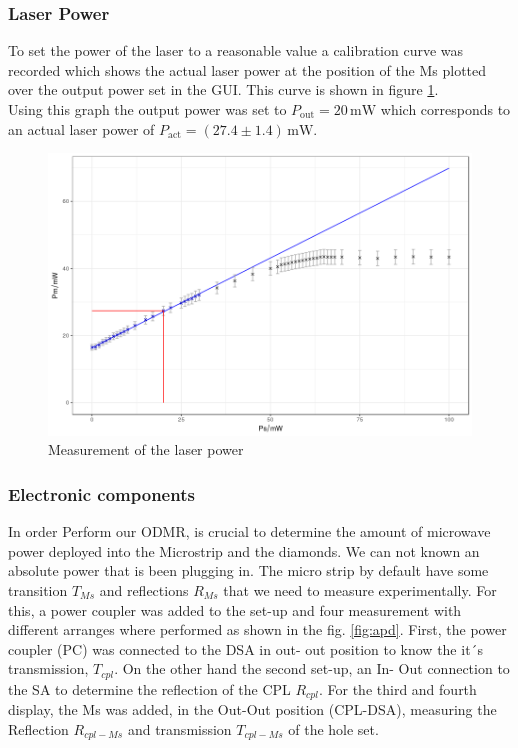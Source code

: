 \subsubsection{Laser Power}
To set the power of the laser to a reasonable value a calibration curve was recorded which shows the actual laser power at the position of the Ms plotted over the output power set in the GUI. This curve is shown in figure \ref{fig:power}.\\

Using this graph the output power was set to $P_\text{out}=20\,\mathrm{mW}$ which corresponds to an actual laser power of $P_\text{act}=(27.4\pm1.4)\,\mathrm{mW}$.
\begin{figure}[hb]
	\centering
	\includegraphics[width=\textwidth]{../figures/powercal.png}
	\caption{Measurement of the laser power}
	\label{fig:power}
\end{figure}


\subsubsection{Electronic components}

In order Perform our ODMR, is crucial to determine the amount of microwave power deployed into the Microstrip and the diamonds. We can not known an absolute power that is been plugging in. The micro strip by default have some transition $T_{Ms}$ and reflections $R_{Ms}$ that we need to measure experimentally.
For this, a power coupler was added to the set-up and four measurement with different arranges where performed as shown in the fig. \ref{fig:apd}.
First, the power coupler (PC) was connected to the DSA in out- out position to know the it´s transmission, $T_{cpl}$. On the other hand the second set-up, an In- Out connection to the SA to determine the reflection of the CPL $R_{cpl}$. For the third and fourth display, the Ms was added, in the Out-Out position (CPL-DSA), measuring the Reflection $R_{cpl-Ms}$ and transmission $T_{cpl-Ms}$ of the hole set.

